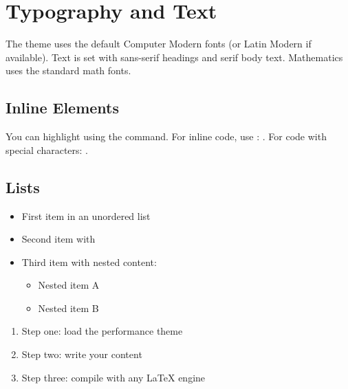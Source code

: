 \documentclass[11pt, a4paper]{article}
\begin{document}

\section{Typography and Text}

The theme uses the default Computer Modern fonts (or Latin Modern if available).
Text is set with sans-serif headings and serif body text. Mathematics uses the
standard math fonts.

\subsection{Inline Elements}

You can highlight  using the \code{\\hltext} command.
For inline code, use \code{\\code}: .
For code with special characters: .

\subsection{Lists}

\begin{itemize}
  \item First item in an unordered list
  \item Second item with 
  \item Third item with nested content:
    \begin{itemize}
      \item Nested item A
      \item Nested item B
    \end{itemize}
\end{itemize}

\begin{enumerate}
  \item Step one: load the performance theme
  \item Step two: write your content
  \item Step three: compile with any LaTeX engine
\end{enumerate}

\end{document}
